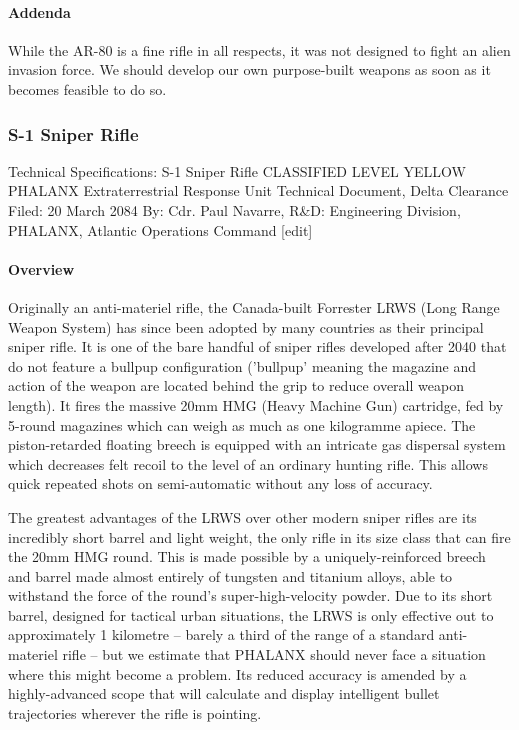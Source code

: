 \paragraph*{Addenda}
While the AR-80 is a fine rifle in all respects, it was not designed to fight an alien invasion force. We should develop our own purpose-built weapons as soon as it becomes feasible to do so.

\newpage

\subsubsection*{S-1 Sniper Rifle}
Technical Specifications: S-1 Sniper Rifle
CLASSIFIED LEVEL YELLOW
PHALANX Extraterrestrial Response Unit
Technical Document, Delta Clearance
Filed: 20 March 2084
By: Cdr. Paul Navarre, R&D: Engineering Division, PHALANX, Atlantic Operations Command
[edit]
\paragraph*{Overview}
Originally an anti-materiel rifle, the Canada-built Forrester LRWS (Long Range Weapon System) has since been adopted by many countries as their principal sniper rifle. It is one of the bare handful of sniper rifles developed after 2040 that do not feature a bullpup configuration ('bullpup' meaning the magazine and action of the weapon are located behind the grip to reduce overall weapon length). It fires the massive 20mm HMG (Heavy Machine Gun) cartridge, fed by 5-round magazines which can weigh as much as one kilogramme apiece. The piston-retarded floating breech is equipped with an intricate gas dispersal system which decreases felt recoil to the level of an ordinary hunting rifle. This allows quick repeated shots on semi-automatic without any loss of accuracy.

The greatest advantages of the LRWS over other modern sniper rifles are its incredibly short barrel and light weight, the only rifle in its size class that can fire the 20mm HMG round. This is made possible by a uniquely-reinforced breech and barrel made almost entirely of tungsten and titanium alloys, able to withstand the force of the round's super-high-velocity powder. Due to its short barrel, designed for tactical urban situations, the LRWS is only effective out to approximately 1 kilometre -- barely a third of the range of a standard anti-materiel rifle -- but we estimate that PHALANX should never face a situation where this might become a problem. Its reduced accuracy is amended by a highly-advanced scope that will calculate and display intelligent bullet trajectories wherever the rifle is pointing.

